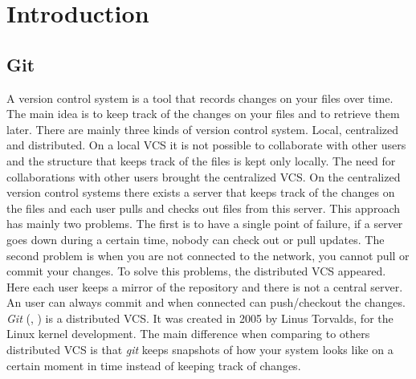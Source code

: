 \section{Introduction}
\subsection{Git}
A version control system is a tool that records changes on your
files over time. The main idea is to keep track of the changes on your
files and to retrieve them later. There are mainly three kinds of 
version control system. Local, centralized and distributed. On
a local VCS it is not possible to collaborate with other users and
the structure that keeps track of the files is kept only locally. The
need for collaborations with other users brought the centralized VCS.
On the centralized version control systems there exists a server that keeps
track of the changes on the files and each user pulls and checks out files
from this server. This approach has mainly two problems. The
first is to have a single point of failure, if a server goes down
during a certain time, nobody can check out or pull updates. The
second problem is when you are not connected to the network, you
cannot pull or commit your changes. To solve this problems, the
distributed VCS appeared. Here each user keeps a mirror of the
repository and there is not a central server. An user can always commit
and when connected can push/checkout the changes.\\

\emph{Git} (\cite{progit}, \cite{gitComm}) is a distributed VCS. It was created in 2005 by Linus Torvalds,
for the Linux kernel development. The main difference when comparing to
others distributed VCS is that \emph{git} keeps snapshots of how your system
looks like on a certain moment in time instead of keeping track of
changes.\par
